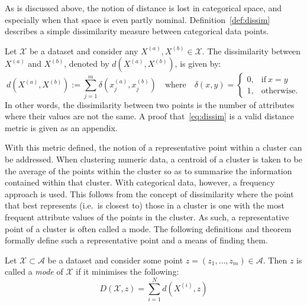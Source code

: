 As is discussed above, the notion of distance is lost in categorical space, and
especially when that space is even partly nominal. Definition~\ref{def:dissim}
describes a simple dissimilarity measure between categorical data points.

\begin{definition}\label{def:dissim}
    Let \(\mathcal{X}\) be a dataset and consider any \(X^{(a)}, X^{(b)} \in
    \mathcal{X}\). The dissimilarity between \(X^{(a)}\) and \(X^{(b)}\),
    denoted by \(d\left(X^{(a)}, X^{(b)}\right)\), is given by:
    \begin{equation}\label{eq:dissim}
        d\left(X^{(a)}, X^{(b)}\right) := \sum_{j=1}^{m} \delta\left(x_j^{(a)},
        x_j^{(b)}\right) \quad \text{where} \quad \delta\left(x, y\right) =
        \begin{cases}
            0, & \text{if} \ x = y \\
            1, & \text{otherwise.}
        \end{cases}
    \end{equation}
    In other words, the dissimilarity between two points is the number of
    attributes where their values are not the same. A proof
    that~\eqref{eq:dissim} is a valid distance metric is given as an appendix.
\end{definition}

%

With this metric defined, the notion of a representative point within a cluster
can be addressed. When clustering numeric data, a centroid of a cluster is taken
to be the average of the points within the cluster so as to summarise the
information contained within that cluster. With categorical data, however, a
frequency approach is used. This follows from the concept of dissimilarity
where the point that best represents (i.e.\ is closest to) those in a cluster
is one with the most frequent attribute values of the points in the cluster. As
such, a representative point of a cluster is often called a mode. The following
definitions and theorem formally define such a representative point and a means
of finding them.

\begin{definition}\label{def:mode}
    Let \(\mathcal{X} \subset \mathcal{A}\) be a dataset and consider some point
    \(z = \left(z_1, \ldots, z_m\right) \in \mathcal{A}\). Then \(z\) is called
    a \emph{mode} of \(\mathcal{X}\) if it minimises the following:
    \begin{equation}\label{eq:summed-dissim}
        D\left(\mathcal{X}, z\right) = \sum_{i=1}^{N} d\left(X^{(i)}, z\right)
    \end{equation}
\end{definition}

